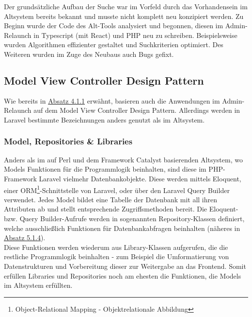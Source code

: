 Der grundsätzliche Aufbau der Suche war im Vorfeld durch das Vorhandensein im Altsystem bereits bekannt und musste nicht komplett neu konzipiert werden. Zu Beginn wurde der Code des Alt-Tools analysiert und begonnen, diesen im Admin-Relaunch in Typescript (mit React) und PHP neu zu schreiben. Beispielsweise wurden Algorithmen effizienter gestaltet und Suchkriterien optimiert. Des Weiteren wurden im Zuge des Neubaus auch Bugs gefixt.

\subsection{Model View Controller Design Pattern}
    Wie bereits in \hyperref[sec:arch]{Absatz 4.1.1} erwähnt, basieren auch die Anwendungen im Admin-Relaunch auf dem Model View Controller Design Pattern. Allerdings werden in Laravel bestimmte Bezeichnungen anders genutzt als im Altsystem.

    \subsubsection{Model, Repositories \& Libraries}
        Anders als im auf Perl und dem Framework Catalyst basierenden Altsystem, wo Models Funktionen für die Programmlogik beinhalten, sind diese im PHP-Framework Laravel vielmehr Datenbankobjekte. Diese werden mittels Eloquent, einer ORM\footnote{Object-Relational Mapping - Objektrelationale Abbildung}-Schnittstelle von Laravel, oder über den Laravel Query Builder verwendet. Jedes Model bildet eine Tabelle der Datenbank mit  all ihren Attributen ab und stellt entsprechende Zugriffsmethoden bereit. Die Eloquent- bzw. \mbox{Query} Builder-Aufrufe werden in sogenannten Repository-Klassen definiert, welche ausschließlich Funktionen für Datenbankabfragen beinhalten (näheres in \hyperref[sec:eloquery]{Absatz 5.1.4}).\\
        Diese Funktionen werden wiederum aus Library-Klassen aufgerufen, die die restliche Programmlogik beinhalten - zum Beispiel die Umformatierung von Datenstrukturen und Vorbereitung dieser zur Weitergabe an das Frontend. Somit erfüllen Libraries und Repositories noch am ehesten die Funktionen, die Models im Altsystem erfüllten.


